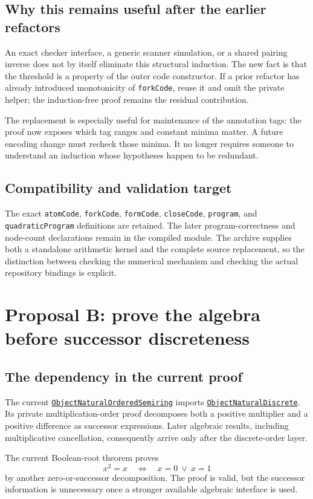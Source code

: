 \documentclass[11pt,letterpaper]{article}
\newcommand{\code}[1]{\nolinkurl{#1}}
\newcommand{\src}[2]{\href{https://github.com/VladimirReshetnikov/ProveIt/blob/1e2a853935a6155cbcf2aa199aaca51946c4fff9/Computability/DiophantineConsistency/Lean/DiophantineConsistency/#1.lean}{\nolinkurl{#2}}}
\begin{document}
\subsection{Why this remains useful after the earlier refactors}
An exact checker interface, a generic scanner simulation, or a shared pairing inverse does not by itself eliminate this structural induction. The new fact is that the threshold is a property of the outer code constructor. If a prior refactor has already introduced monotonicity of \code{forkCode}, reuse it and omit the private helper; the induction-free proof remains the residual contribution.

The replacement is especially useful for maintenance of the annotation tags: the proof now exposes which tag ranges and constant minima matter. A future encoding change must recheck those minima. It no longer requires someone to understand an induction whose hypotheses happen to be redundant.

\subsection{Compatibility and validation target}
The exact \code{atomCode}, \code{forkCode}, \code{formCode}, \code{closeCode}, \code{program}, and \code{quadraticProgram} definitions are retained. The later program-correctness and node-count declarations remain in the compiled module. The archive supplies both a standalone arithmetic kernel and the complete source replacement, so the distinction between checking the numerical mechanism and checking the actual repository bindings is explicit.

\section{Proposal B: prove the algebra before successor discreteness}
\subsection{The dependency in the current proof}
The current \src{ObjectNaturalOrderedSemiring}{ObjectNaturalOrderedSemiring} imports \src{ObjectNaturalDiscrete}{ObjectNaturalDiscrete}. Its private multiplication-order proof decomposes both a positive multiplier and a positive difference as successor expressions. Later algebraic results, including multiplicative cancellation, consequently arrive only after the discrete-order layer.

The current Boolean-root theorem proves
\[
 x^2=x\quad\Longleftrightarrow\quad x=0\ \lor\ x=1
\]
by another zero-or-successor decomposition. The proof is valid, but the successor information is unnecessary once a stronger available algebraic interface is used.
\end{document}
